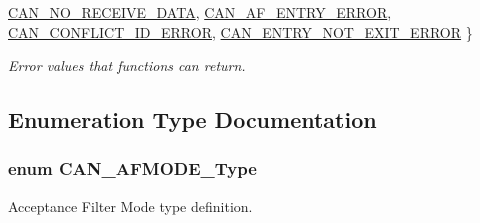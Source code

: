 \begin{DoxyCompactItemize}
\hyperlink{group___c_a_n___public___types_gga1d9859e6b360c9448574f86ea199a112acb34fb76c58b0d940982e4cbc329e9b7}{\-C\-A\-N\-\_\-\-N\-O\-\_\-\-R\-E\-C\-E\-I\-V\-E\-\_\-\-D\-A\-T\-A}, 
\*
\hyperlink{group___c_a_n___public___types_gga1d9859e6b360c9448574f86ea199a112a4f4da9e3bb31b105b68f6627f1911aa4}{\-C\-A\-N\-\_\-\-A\-F\-\_\-\-E\-N\-T\-R\-Y\-\_\-\-E\-R\-R\-O\-R}, 
\hyperlink{group___c_a_n___public___types_gga1d9859e6b360c9448574f86ea199a112a951836b4a7c09597fbbc378549232a3e}{\-C\-A\-N\-\_\-\-C\-O\-N\-F\-L\-I\-C\-T\-\_\-\-I\-D\-\_\-\-E\-R\-R\-O\-R}, 
\hyperlink{group___c_a_n___public___types_gga1d9859e6b360c9448574f86ea199a112a2b33e6dc62ac475ad363ec9a6ddb8bfa}{\-C\-A\-N\-\_\-\-E\-N\-T\-R\-Y\-\_\-\-N\-O\-T\-\_\-\-E\-X\-I\-T\-\_\-\-E\-R\-R\-O\-R}
 \}
\begin{DoxyCompactList}\small\item\em \-Error values that functions can return. \end{DoxyCompactList}\end{DoxyCompactItemize}


\subsection{\-Enumeration \-Type \-Documentation}
\hypertarget{group___c_a_n___public___types_gafacd7b7c906689c2aaa0564ac8154d00}{
\subsubsection[{\-C\-A\-N\-\_\-\-A\-F\-M\-O\-D\-E\-\_\-\-Type}]{\setlength{\rightskip}{0pt plus 5cm}enum {\bf \-C\-A\-N\-\_\-\-A\-F\-M\-O\-D\-E\-\_\-\-Type}}}\label{group___c_a_n___public___types_gafacd7b7c906689c2aaa0564ac8154d00}


\-Acceptance \-Filter \-Mode type definition. 

